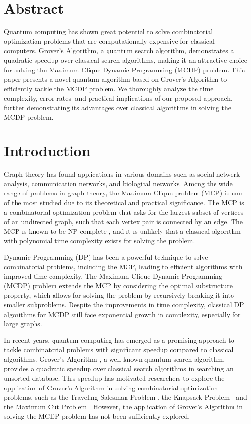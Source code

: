 \section*{Abstract}

Quantum computing has shown great potential to solve combinatorial optimization problems that are computationally expensive for classical computers. Grover's Algorithm, a quantum search algorithm, demonstrates a quadratic speedup over classical search algorithms, making it an attractive choice for solving the Maximum Clique Dynamic Programming (MCDP) problem. This paper presents a novel quantum algorithm based on Grover's Algorithm to efficiently tackle the MCDP problem. We thoroughly analyze the time complexity, error rates, and practical implications of our proposed approach, further demonstrating its advantages over classical algorithms in solving the MCDP problem.

\section*{Introduction}

Graph theory has found applications in various domains such as social network analysis, communication networks, and biological networks. Among the wide range of problems in graph theory, the Maximum Clique problem (MCP) is one of the most studied due to its theoretical and practical significance. The MCP is a combinatorial optimization problem that asks for the largest subset of vertices of an undirected graph, such that each vertex pair is connected by an edge. The MCP is known to be NP-complete \cite{Karp1972}, and it is unlikely that a classical algorithm with polynomial time complexity exists for solving the problem.

Dynamic Programming (DP) has been a powerful technique to solve combinatorial problems, including the MCP, leading to efficient algorithms with improved time complexity. The Maximum Clique Dynamic Programming (MCDP) problem extends the MCP by considering the optimal substructure property, which allows for solving the problem by recursively breaking it into smaller subproblems. Despite the improvements in time complexity, classical DP algorithms for MCDP still face exponential growth in complexity, especially for large graphs.

In recent years, quantum computing has emerged as a promising approach to tackle combinatorial problems with significant speedup compared to classical algorithms. Grover's Algorithm \cite{Grover1996}, a well-known quantum search algorithm, provides a quadratic speedup over classical search algorithms in searching an unsorted database. This speedup has motivated researchers to explore the application of Grover's Algorithm in solving combinatorial optimization problems, such as the Traveling Salesman Problem \cite{TSP}, the Knapsack Problem \cite{Knapsack}, and the Maximum Cut Problem \cite{MaxCut}. However, the application of Grover's Algorithm in solving the MCDP problem has not been sufficiently explored.

